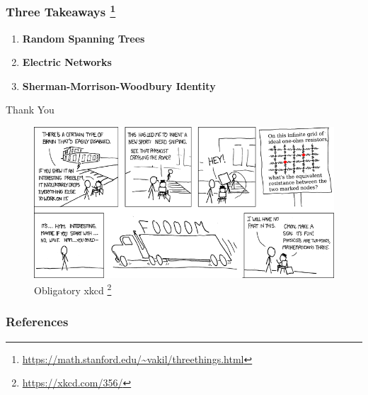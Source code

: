 \documentclass{beamer}
\newcommand\Fontvi{\fontsize{6}{7.2}\selectfont}
\begin{document}





\begin{frame}
 \frametitle{Three Takeaways \footnote{\url{https://math.stanford.edu/~vakil/threethings.html}}}
 
 \begin{enumerate}
  \item \textbf{Random Spanning Trees} 
  \item \textbf{Electric Networks}
  \item \textbf{Sherman-Morrison-Woodbury Identity}
 \end{enumerate}

 
 
\end{frame}



\begin{frame}
\centering
\Huge{Thank You}
\begin{figure}
 \centering
 \includegraphics[scale=0.4]{nerd_sniping.png}
 \caption{Obligatory xkcd \footnote{\url{https://xkcd.com/356/}} }
\end{figure}



\end{frame}

% 

\begin{frame}[allowframebreaks]
\frametitle{References}
\Fontvi
 

\end{frame}



\end{document}
